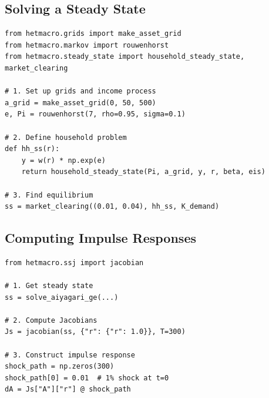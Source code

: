 \documentclass[12pt]{book}
\begin{document}
\subsection{Solving a Steady State}
\begin{lstlisting}
from hetmacro.grids import make_asset_grid
from hetmacro.markov import rouwenhorst
from hetmacro.steady_state import household_steady_state, market_clearing

# 1. Set up grids and income process
a_grid = make_asset_grid(0, 50, 500)
e, Pi = rouwenhorst(7, rho=0.95, sigma=0.1)

# 2. Define household problem
def hh_ss(r):
    y = w(r) * np.exp(e)
    return household_steady_state(Pi, a_grid, y, r, beta, eis)

# 3. Find equilibrium
ss = market_clearing((0.01, 0.04), hh_ss, K_demand)
\end{lstlisting}

\subsection{Computing Impulse Responses}
\begin{lstlisting}
from hetmacro.ssj import jacobian

# 1. Get steady state
ss = solve_aiyagari_ge(...)

# 2. Compute Jacobians
Js = jacobian(ss, {"r": {"r": 1.0}}, T=300)

# 3. Construct impulse response
shock_path = np.zeros(300)
shock_path[0] = 0.01  # 1% shock at t=0
dA = Js["A"]["r"] @ shock_path
\end{lstlisting}
\end{document}

